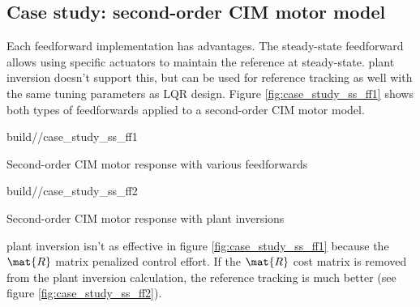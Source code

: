 \subsection{Case study: second-order CIM motor model}

Each feedforward implementation has advantages. The steady-state feedforward
allows using specific actuators to maintain the \gls{reference} at steady-state.
\Gls{plant} inversion doesn't support this, but can be used for \gls{reference}
\gls{tracking} as well with the same tuning parameters as LQR design. Figure
\ref{fig:case_study_ss_ff1} shows both types of feedforwards applied to a
second-order CIM motor model.
\begin{bookfigure}
  \begin{minisvg}{2}{build/\partpath/case_study_ss_ff1}
    \caption{Second-order CIM motor response with various feedforwards}
    \label{fig:case_study_ss_ff1}
  \end{minisvg}
  \hfill
  \begin{minisvg}{2}{build/\partpath/case_study_ss_ff2}
    \caption{Second-order CIM motor response with plant inversions}
    \label{fig:case_study_ss_ff2}
  \end{minisvg}
\end{bookfigure}

\Gls{plant} inversion isn't as effective in figure \ref{fig:case_study_ss_ff1}
because the $\mat{R}$ matrix penalized \gls{control effort}. If the $\mat{R}$
cost matrix is removed from the \gls{plant} inversion calculation, the
\gls{reference} \gls{tracking} is much better (see figure
\ref{fig:case_study_ss_ff2}).

